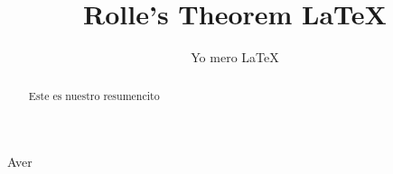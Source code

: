 \documentclass{article}
\title{Rolle's Theorem \LaTeX}
\author{Yo mero \LaTeX}
\date{}
\begin{document}
    \maketitle

    \begin{abstract}
        Este es nuestro resumencito
    \end{abstract}
    Aver
\end{document}

